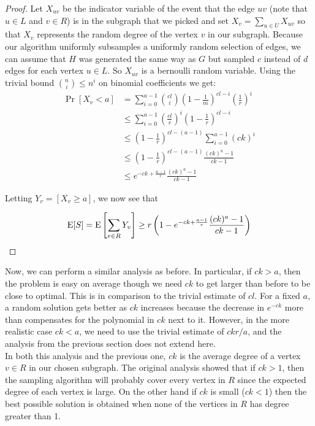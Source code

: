 \begin{proof}
Let $X_{uv}$ be the indicator variable of the event that the edge $uv$
(note that $u\in L$ and $v\in R$) is in the subgraph that we picked
and set $X_{v} = \sum_{u\in U} X_{uv}$ so that $X_{v}$ represents the
random degree of the vertex $v$ in our subgraph. Because our algorithm
uniformly subsamples a uniformly random selection of edges, we can
assume that $H$ was generated the same way as $G$ but sampled $c$
instead of $d$ edges for each vertex $u\in L$. So $X_{uv}$ is a
bernoulli random variable. Using the trivial bound $\binom{n}{i}
\leq n^i$ on binomial coefficients we get:
\begin{align*}
      \Pr[X_v < a]
&=    \sum_{i=0}^{a-1} \binom{cl}{i} \left(1-\frac{1}{m}\right)^{cl-i}\left(\frac{1}{r}\right)^i \\
&\leq \sum_{i=0}^{a-1} \left(\frac{cl}{r}\right)^i\left(1-\frac{1}{r}\right)^{cl-i} \\
&\leq    \left(1-\frac{1}{r}\right)^{cl-(a-1)}\sum_{i=0}^{a-1} (ck)^i \\
&\leq \left(1-\frac{1}{r}\right)^{cl-(a-1)}\frac{(ck)^a-1}{ck-1} \\
&\leq e^{-ck+\frac{a-1}{r}} \frac{(ck)^a-1}{ck-1}
\end{align*}


Letting $Y_v = \left[X_v \geq a\right]$, we now see that

\[ \text{E}[S] = \text{E}\left[\sum_{v\in R} Y_v\right] \geq r\left(1-e^{-ck+\frac{a-1}{r}} \frac{(ck)^a-1}{ck-1}\right) \]
\end{proof}

Now, we can perform a similar analysis as before. In
particular, if $ck>a$, then the problem is easy on average though we
need $ck$ to get larger than before to be close to optimal. This
is in comparison to the trivial estimate of $cl$. For a fixed $a$, a
random solution gets better as $ck$ increases because the decrease in
$e^{-ck}$ more than compensates for the polynomial in $ck$ next to
it. However, in the more realistic case $ck<a$, we need to use the trivial estimate of $ckr/a$, and the analysis from the previous section does not extend
here. \\



In both this analysis and the previous one, $ck$ is the average degree
of a vertex $v\in R$ in our chosen subgraph. The original analysis showed that if $ck>1$, then the sampling algorithm will probably cover every vertex in $R$ since the expected degree of each vertex is large. On the other hand if $ck$ is small ($ck < 1$) then the best possible solution is obtained when none of the vertices
in $R$ has degree greater than 1. 

